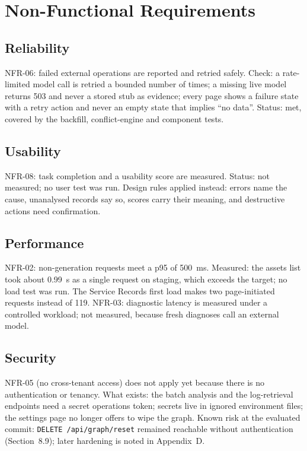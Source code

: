 \section{Non-Functional Requirements}

\subsection{Reliability}

NFR-06: failed external operations are reported and retried safely. Check: a rate-limited model call is retried a bounded number of times; a missing live model returns 503 and never a stored stub as evidence; every page shows a failure state with a retry action and never an empty state that implies ``no data''. Status: met, covered by the backfill, conflict-engine and component tests.

\subsection{Usability}

NFR-08: task completion and a usability score are measured. Status: not measured; no user test was run. Design rules applied instead: errors name the cause, unanalysed records say so, scores carry their meaning, and destructive actions need confirmation.

\subsection{Performance}

NFR-02: non-generation requests meet a p95 of 500~ms. Measured: the assets list took about 0.99~s as a single request on staging, which exceeds the target; no load test was run. The Service Records first load makes two page-initiated requests instead of 119. NFR-03: diagnostic latency is measured under a controlled workload; not measured, because fresh diagnoses call an external model.

\subsection{Security}

NFR-05 (no cross-tenant access) does not apply yet because there is no authentication or tenancy. What exists: the batch analysis and the log-retrieval endpoints need a secret operations token; secrets live in ignored environment files; the settings page no longer offers to wipe the graph. Known risk at the evaluated commit: \texttt{DELETE /api/graph/reset} remained reachable without authentication (Section~8.9); later hardening is noted in Appendix~D.

